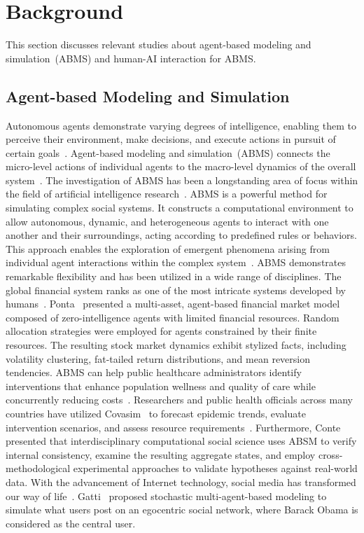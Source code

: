\section{Background}
This section discusses relevant studies about agent-based modeling and simulation~(ABMS) and human-AI interaction for ABMS.
\subsection{Agent-based Modeling and Simulation}
Autonomous agents demonstrate varying degrees of intelligence, enabling them to perceive their environment, make decisions, and execute actions in pursuit of certain goals~\cite{10.1007/BFb0013570,wooldridge_jennings_1995}.
Agent-based modeling and simulation~(ABMS) connects the micro-level actions of individual agents to the macro-level dynamics of the overall system~\cite{8352646}.
The investigation of ABMS has been a longstanding area of focus within the field of artificial intelligence research~\cite{1574234,5429318,doi:10.1177/0037549706073695}.
ABMS is a powerful method for simulating complex social systems. 
It constructs a computational environment to allow autonomous, dynamic, and heterogeneous agents to interact with one another and their surroundings, acting according to predefined rules or behaviors.
This approach enables the exploration of emergent phenomena arising from individual agent interactions within the complex system~\cite{helbing_agent-based_2012,doi:10.1073/pnas.072081299}.
ABMS demonstrates remarkable flexibility and has been utilized in a wide range of disciplines.
The global financial system ranks as one of the most intricate systems developed by humans~\cite{Wang_2018, Samanidou_2007}.
Ponta\etal~\cite{Ponta_2011} presented a multi-asset, agent-based financial market model composed of zero-intelligence agents with limited financial resources.
Random allocation strategies were employed for agents constrained by their finite resources. 
The resulting stock market dynamics exhibit stylized facts, including volatility clustering, fat-tailed return distributions, and mean reversion tendencies.
ABMS can help public healthcare administrators identify interventions that enhance population wellness and quality of care while concurrently reducing costs~\cite{SILVERMAN201561,williams2023epidemicmodelinggenerativeagents,el-sayed_social_2012}.
Researchers and public health officials across many countries have utilized Covasim~\cite {kerr_covasim_2021} to forecast epidemic trends, evaluate intervention scenarios, and assess resource requirements~\cite{SILVA2020110088}.
Furthermore, Conte\etal~\cite{10.3389/fpsyg.2014.00668} presented that interdisciplinary computational social science uses ABSM to verify internal consistency, examine the resulting aggregate states, and employ cross-methodological experimental approaches to validate hypotheses against real-world data.
With the advancement of Internet technology, social media has transformed our way of life~\cite{KAPLAN201059}.
Gatti\etal~\cite{gatti_large-scale_2014} proposed stochastic multi-agent-based modeling to simulate what users post on an egocentric social network, where Barack Obama is considered as the central user.

